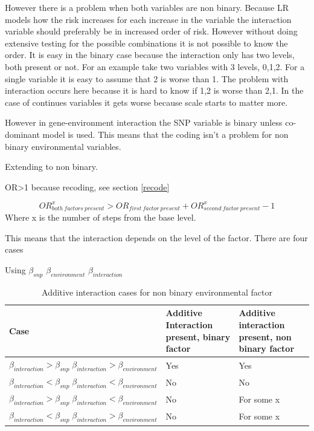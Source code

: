 \documentclass[10pt,a4paper]{report}
\newcounter{example}
\begin{document}
However there is a problem when both variables are non binary. Because LR models how the risk increases for each increase in the variable the interaction variable should preferably be in increased order of risk. However without doing extensive testing for the possible combinations it is not possible to know the order. It is easy in the binary case because the interaction only has two levels, both present or not. For an example take two variables with 3 levels, 0,1,2. For a single variable it is easy to assume that 2 is worse than 1. The problem with interaction occurs here because it is hard to know if 1,2 is worse than 2,1. In the case of continues variables it gets worse because scale starts to matter more.

However in gene-environment interaction the SNP variable is binary unless co-dominant model is used. This means that the coding isn't a problem for non binary environmental variables.


Extending to non binary.

OR>1 because recoding, see section \ref{recode}

\begin{equation}
OR_{both\:factors\:present}^x>OR_{first\:factor\:present}+OR_{second\:factor\:present}^x-1
\end{equation}
Where x is the number of steps from the base level.

This means that the interaction depends on the level of the factor. There are four cases

Using $\beta_{snp}$
$\beta_{environment}$
$\beta_{interaction}$

\begin{table}[h]
\begin{tabular}{| l | l | l |}
  \hline
  Case & Additive Interaction present, binary factor & Additive interaction present, non binary factor\\
  \hline
  $\beta_{interaction}>\beta_{snp} \; \beta_{interaction}>\beta_{environment}$ & Yes & Yes\\
  $\beta_{interaction}<\beta_{snp} \; \beta_{interaction}<\beta_{environment}$ & No & No\\
  $\beta_{interaction}>\beta_{snp} \; \beta_{interaction}<\beta_{environment}$ & No & For some x\\
  $\beta_{interaction}<\beta_{snp} \; \beta_{interaction}>\beta_{environment}$ & No & For some x\\
  \hline  
\end{tabular}
\caption{Additive interaction cases for non binary environmental factor}
\label{table:additive_interaction}
\end{table}
\end{document}
